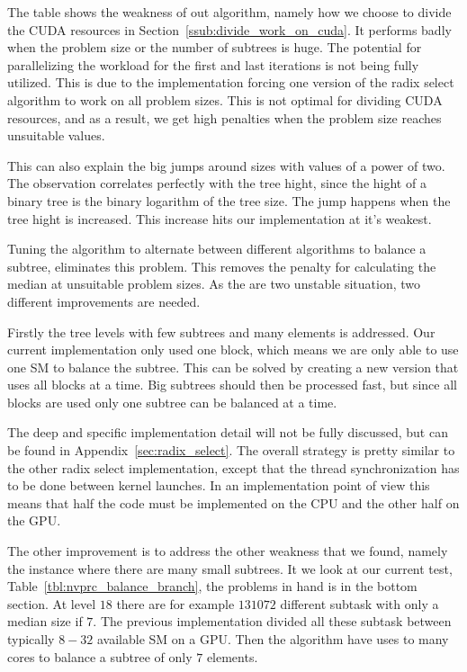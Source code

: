 The table shows the weakness of out algorithm, namely how we choose to divide the CUDA resources in Section~\ref{ssub:divide_work_on_cuda}. It performs badly when the problem size or the number of subtrees is huge. The potential for parallelizing the workload for the first and last iterations is not being fully utilized. This is due to the implementation forcing one version of the radix select algorithm to work on all problem sizes. This is not optimal for dividing CUDA resources, and as a result, we get high penalties when the problem size reaches unsuitable values.

This can also explain the big jumps around sizes with values of a power of two. The observation correlates perfectly with the tree hight, since the hight of a binary tree is the binary logarithm of the tree size. The jump happens when the tree hight is increased. This increase hits our implementation at it's weakest.

Tuning the algorithm to alternate between different algorithms to balance a subtree, eliminates this problem. This removes the penalty for calculating the median at unsuitable problem sizes. As the are two unstable situation, two different improvements are needed.

Firstly the tree levels with few subtrees and many elements is addressed. Our current implementation only used one block, which means we are only able to use one SM to balance the subtree. This can be solved by creating a new version that uses all blocks at a time. Big subtrees should then be processed fast, but since all blocks are used only one subtree can be balanced at a time.

The deep and specific implementation detail will not be fully discussed, but can be found in Appendix~\ref{sec:radix_select}. The overall strategy is pretty similar to the other radix select implementation, except that the thread synchronization has to be done between kernel launches. In an implementation point of view this means that half the code must be implemented on the CPU and the other half on the GPU\@.

The other improvement is to address the other weakness that we found, namely the instance where there are many small subtrees. It we look at our current test,  Table~\ref{tbl:nvprc_balance_branch}, the problems in hand is in the  bottom section. At level $18$ there are for example $131072$ different subtask with only a median size if $7$. The previous implementation divided all these subtask between typically $8-32$ available SM on a GPU\@. Then the algorithm have uses to many cores to balance a subtree of only $7$ elements.

